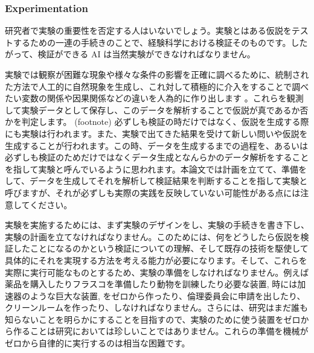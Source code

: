 
\subsubsection{Experimentation}
\label{section-experimentation}
研究者で実験の重要性を否定する人はいないでしょう。実験とはある仮説をテストするための一連の手続きのことで、経験科学における検証そのものです。したがって、検証ができる AI は当然実験ができなければなりません。

実験では観察が困難な現象や様々な条件の影響を正確に調べるために、統制された方法で人工的に自然現象を生成し、これ対して積極的に介入をすることで調べたい変数の関係や因果関係などの違いを人為的に作り出します \cite{radder2009philosophy}。これらを観測して実験データとして保存し、このデータを解析することで仮説が真であるか否かを判定します。
(footnote) 必ずしも検証の時だけではなく、仮説を生成する際にも実験は行われます。また、実験で出てきた結果を受けて新しい問いや仮説を生成することが行われます。この時、データを生成するまでの過程を、あるいは必ずしも検証のためだけではなくデータ生成となんらかのデータ解析をすることを指して実験と呼んでいるように思われます。本論文では計画を立てて、準備をして、データを生成してそれを解析して検証結果を判断することを指して実験と呼びますが、それが必ずしも実際の実践を反映していない可能性がある点には注意してください。

実験を実施するためには、まず実験のデザインをし、実験の手続きを書き下し、実験の計画を立てなければなりません。このためには、何をどうしたら仮説を検証したことになるのかという検証についての理解、そして既存の技術を駆使して具体的にそれを実現する方法を考える能力が必要になります。そして、これらを実際に実行可能なものとするため、実験の準備をしなければなりません。例えば薬品を購入したりフラスコを準備したり動物を訓練したり必要な装置, 時には加速器のような巨大な装置, をゼロから作ったり、倫理委員会に申請を出したり、クリーンルームを作ったり、しなければなりません。さらには、研究はまだ誰も知らないことを明らかにすることを目指すので、実験のために使う装置をゼロから作ることは研究においては珍しいことではありません。これらの準備を機械がゼロから自律的に実行するのは相当な困難です。

